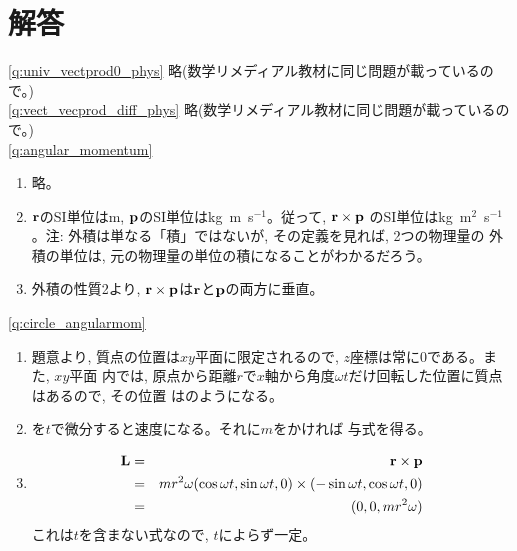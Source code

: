 \section{解答}

\ref{q:univ_vectprod0_phys} 略(数学リメディアル教材に同じ問題が載っているので。)\\

\ref{q:vect_vecprod_diff_phys} 略(数学リメディアル教材に同じ問題が載っているので。)\\

\ref{q:angular_momentum}　
\begin{enumerate}
\item 略。
\item ${\bf r}$のSI単位はm, ${\bf p}$のSI単位はkg~m~s$^{-1}$。従って, ${\bf r}\times{\bf p}$
のSI単位はkg~m$^2$~s$^{-1}$。注: 外積は単なる「積」ではないが, その定義を見れば, 2つの物理量の
外積の単位は, 元の物理量の単位の積になることがわかるだろう。
\item 外積の性質2より, ${\bf r}\times{\bf p}$は${\bf r}$と${\bf p}$の両方に垂直。
\end{enumerate}
\vspace{0.2cm}

\ref{q:circle_angularmom}
\begin{enumerate}
\item 題意より, 質点の位置は$xy$平面に限定されるので, $z$座標は常に0である。また, $xy$平面
内では, 原点から距離$r$で$x$軸から角度$\omega t$だけ回転した位置に質点はあるので, その位置
はのようになる。
\item {}を$t$で微分すると速度になる。それに$m$をかければ
与式を得る。
\item 
\begin{eqnarray*}
{\bf L}&=&{\bf r}\times{\bf p}\\
       &=&mr^2\omega(\cos \omega t, \sin \omega t, 0)
         \times(-\sin \omega t, \cos \omega t, 0)\\
       &=&(0, 0, mr^2\omega)
\end{eqnarray*}
これは$t$を含まない式なので, $t$によらず一定。
\end{enumerate}
\vspace{0.2cm}

